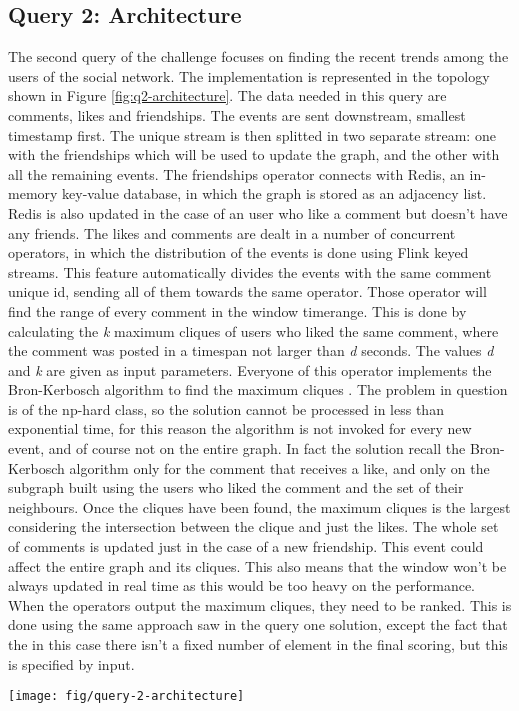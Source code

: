 \subsection{Query 2: Architecture}
\label{sec:solution-q2}

The second query of the challenge focuses on finding the recent trends among the users of the social network. The implementation is represented in the topology shown in Figure \ref{fig:q2-architecture}. The data needed in this query are comments, likes and friendships. The events are sent downstream, smallest timestamp first. The unique stream is then splitted in two separate stream: one with the friendships which will be used to update the graph, and the other with all the remaining events. The friendships operator connects with Redis, an in-memory key-value database, in which the graph is stored as an adjacency list. Redis is also updated in the case of an user who like a comment but doesn't have any friends. The likes and comments are dealt in a number of concurrent operators, in which the distribution of the events is done using Flink keyed streams. This feature automatically divides the events with the same comment unique id, sending all of them towards the same operator. Those operator will find the range of every comment in the window timerange. This is done by calculating the \textit{k} maximum cliques of users who liked the same comment, where the comment was posted in a timespan not larger than \textit{d} seconds. The values \textit{d} and \textit{k} are given as input parameters. Everyone of this operator implements the Bron-Kerbosch algorithm to find the maximum cliques \cite{BronKerbosch1973}. The problem in question is of the np-hard class, so the solution cannot be processed in less than exponential time, for this reason the algorithm is not invoked for every new event, and of course not on the entire graph. In fact the solution recall the Bron-Kerbosch algorithm only for the comment that receives a like, and only on the subgraph built using the users who liked the comment and the set of their neighbours. Once the cliques have been found, the maximum cliques is the largest considering the intersection between the clique and just the likes. The whole set of comments is updated just in the case of a new friendship. This event could affect the entire graph and its cliques. This also means that the window won't be always updated in real time as this would be too heavy on the performance. When the operators output the maximum cliques, they need to be ranked. This is done using the same approach saw in the query one solution, except the fact that the in this case there isn't a fixed number of element in the final scoring, but this is specified by input.

\begin{figure*}[]
	\centering
	\texttt{[image: fig/query-2-architecture]}
	\caption{The topology of operators for Query 2.}
	\label{fig:q2-architecture}
\end{figure*}